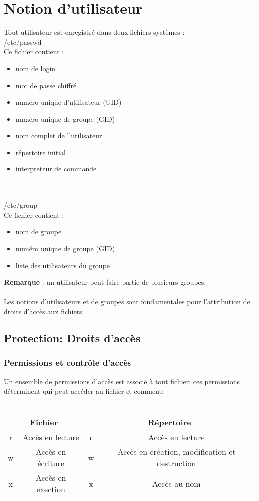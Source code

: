 	\chapter{Notion d'utilisateur}
		Tout utilisateur est enregistré dans deux fichiers systèmes : \\
		/etc/passwd\\ 
		Ce fichier contient : 
		\begin{itemize}
			\item nom de login
			\item mot de passe chiffré
			\item numéro unique d'utilisateur (UID)
			\item numéro unique de groupe (GID)
			\item nom complet de l'utilisateur
			\item répertoire initial
			\item interpréteur de commande  
		\end{itemize}		\\ \\
		/etc/group\\
		Ce fichier contient :
		\begin{itemize}		 
			\item nom de groupe
			\item numéro unique de groupe (GID)
			\item liste des utilisateurs du groupe
		\end{itemize}
		\textbf{Remarque} : un utilisateur peut faire partie de plusieurs groupes.\\ \\
		Les notions d'utilisateurs et de groupes sont fondamentales pour l'attribution de droits d'accès aux fichiers.
		\section{Protection: Droits d'accès}
			\subsection{Permissions et contrôle d'accès}
				Un ensemble de permissions d'accès est associé à tout fichier; ces permissions déterminent qui peut accéder au fichier et comment:\\ \\
				\begin{tabular}{|c|c|c|c|}
					\hline
						\multicolumn{2}{|c}{Fichier} & \multicolumn{2}{|c|}{Répertoire} \\
					\hline
						r & Accès en lecture & r & Accès en lecture \\
					\hline
						w & Accès en écriture & w & Accès en création, modification et destruction\\
					\hline 
						x & Accès en exection & x & Accès au nom \\
					\hline 
				\end{tabular}\\ \\
				
